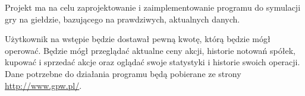 Projekt ma na celu zaprojektowanie i zaimplementowanie programu do symulacji gry na giełdzie,
bazującego na prawdziwych, aktualnych danych.

Użytkownik na wstępie będzie dostawał pewną kwotę, którą będzie mógł operować. Będzie mógł przeglądać
aktualne ceny akcji, historie notowań spółek, kupować i sprzedać akcje oraz oglądać swoje statystyki
i historie swoich operacji. Dane potrzebne do działania programu będą pobierane ze strony 
\url{http://www.gpw.pl/}.

